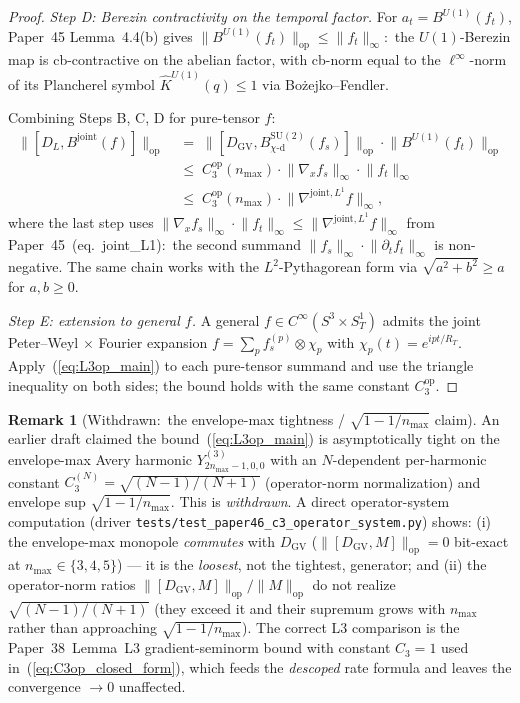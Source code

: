 \documentclass[11pt,a4paper]{article}
\theoremstyle{plain}
\theoremstyle{definition}
\newtheorem{remark}[theorem]{Remark}
\newcommand{\nmax}{n_{\max}}
\newcommand{\Manifold}{S^{3}\times S^{1}_{T}}
\newcommand{\opnorm}[1]{\lVert #1 \rVert_{\mathrm{op}}}
\newcommand{\norm}[1]{\lVert #1 \rVert}
\newcommand{\SU}{\mathrm{SU}}
\newcommand{\Uone}{U(1)}
\newcommand{\DGV}{D_{\mathrm{GV}}}
\newcommand{\DL}{D_{L}}
\newcommand{\Bjoint}{B^{\mathrm{joint}}}
\newcommand{\Cthreeop}{C_{3}^{\mathrm{op}}}
\newcommand{\chid}{\chi\text{-d}}
\newcommand{\Plancherel}{\hat}
\begin{document}
\begin{proof}
\emph{Step D: Berezin contractivity on the temporal factor.}
For $a_{t} = B^{\Uone}(f_{t})$, Paper~45 Lemma~4.4(b) gives
$\opnorm{B^{\Uone}(f_{t})} \le \norm{f_{t}}_{\infty}$:\ the
$\Uone$-Berezin map is cb-contractive on the abelian factor, with
cb-norm equal to the $\ell^{\infty}$-norm of its Plancherel symbol
$\Plancherel{K}^{\Uone}(q) \le 1$ via Bo\.zejko--Fendler.

Combining Steps B, C, D for pure-tensor $f$:
\begin{align*}
   \opnorm{[\DL, \Bjoint(f)]}
   &\;=\; \opnorm{[\DGV, B^{\SU(2)}_{\chid}(f_{s})]} \cdot \opnorm{B^{\Uone}(f_{t})} \\
   &\;\le\; \Cthreeop(\nmax) \cdot \norm{\nabla_{x} f_{s}}_{\infty}
            \cdot \norm{f_{t}}_{\infty} \\
   &\;\le\; \Cthreeop(\nmax) \cdot \norm{\nabla^{\mathrm{joint}, L^{1}} f}_{\infty},
\end{align*}
where the last step uses
$\norm{\nabla_{x} f_{s}}_{\infty} \cdot \norm{f_{t}}_{\infty}
\le \norm{\nabla^{\mathrm{joint}, L^{1}} f}_{\infty}$ from
Paper~45~(eq.~joint\_L1):\ the second summand
$\norm{f_{s}}_{\infty} \cdot \norm{\partial_{t} f_{t}}_{\infty}$ is
non-negative. The same chain works with the $L^{2}$-Pythagorean form
via $\sqrt{a^{2} + b^{2}} \ge a$ for $a, b \ge 0$.

\emph{Step E: extension to general $f$.} A general
$f \in C^{\infty}(\Manifold)$ admits the joint Peter--Weyl $\times$
Fourier expansion $f = \sum_{p} f_{s}^{(p)} \otimes \chi_{p}$ with
$\chi_{p}(t) = e^{i p t / R_{T}}$. Apply~(\ref{eq:L3op_main}) to each
pure-tensor summand and use the triangle inequality on both sides; the
bound holds with the same constant $\Cthreeop$. \qedhere
\end{proof}

\begin{remark}[Withdrawn:\ the envelope-max tightness / $\sqrt{1-1/\nmax}$ claim]
\label{rem:env_tightness}
An earlier draft claimed the bound~(\ref{eq:L3op_main}) is asymptotically
tight on the envelope-max Avery harmonic $Y^{(3)}_{2\nmax - 1, 0, 0}$ with
an $N$-dependent per-harmonic constant $C_{3}^{(N)} = \sqrt{(N-1)/(N+1)}$
(operator-norm normalization) and envelope sup $\sqrt{1 - 1/\nmax}$. This
is \emph{withdrawn}. A direct operator-system computation (driver
\texttt{tests/test\_paper46\_c3\_operator\_system.py}) shows: (i) the envelope-max
monopole \emph{commutes} with $\DGV$ ($\opnorm{[\DGV, M]} = 0$ bit-exact at
$\nmax \in \{3, 4, 5\}$) --- it is the \emph{loosest}, not the tightest,
generator; and (ii) the operator-norm ratios
$\opnorm{[\DGV, M]} / \opnorm{M}$ do not realize $\sqrt{(N-1)/(N+1)}$ (they
exceed it and their supremum grows with $\nmax$ rather than approaching
$\sqrt{1 - 1/\nmax}$). The correct L3 comparison is the Paper~38~Lemma~L3
gradient-seminorm bound with constant $C_{3} = 1$ used in~(\ref{eq:C3op_closed_form}),
which feeds the \emph{descoped} rate formula and leaves the convergence
$\to 0$ unaffected.
\end{remark}
\end{document}
